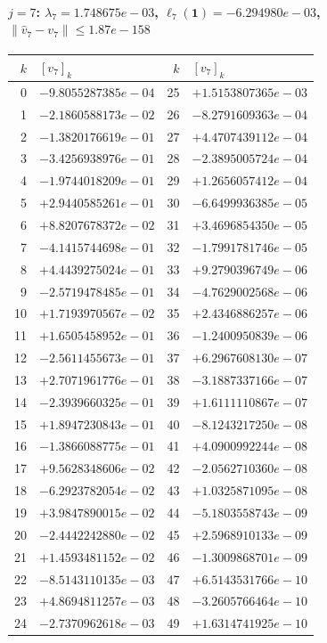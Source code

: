 \documentclass[11pt]{article}
\begin{document}
\paragraph{$j = 7$: $\lambda_{7} = 1.748675e-03$, \quad $\ell_{7}(\mathbf{1}) = -6.294980e-03$, \quad $\|\hat v_{7} - v_{7}\| \leq 1.87e-158$}
\begin{center}
{\footnotesize
\begin{tabular}{r@{\;\;}l@{\quad}r@{\;\;}l}
\toprule
$k$ & $[v_{7}]_k$ & $k$ & $[v_{7}]_k$ \\
\midrule
0 & $-9.8055287385e-04$ & 25 & $+1.5153807365e-03$ \\
1 & $-2.1860588173e-02$ & 26 & $-8.2791609363e-04$ \\
2 & $-1.3820176619e-01$ & 27 & $+4.4707439112e-04$ \\
3 & $-3.4256938976e-01$ & 28 & $-2.3895005724e-04$ \\
4 & $-1.9744018209e-01$ & 29 & $+1.2656057412e-04$ \\
5 & $+2.9440585261e-01$ & 30 & $-6.6499936385e-05$ \\
6 & $+8.8207678372e-02$ & 31 & $+3.4696854350e-05$ \\
7 & $-4.1415744698e-01$ & 32 & $-1.7991781746e-05$ \\
8 & $+4.4439275024e-01$ & 33 & $+9.2790396749e-06$ \\
9 & $-2.5719478485e-01$ & 34 & $-4.7629002568e-06$ \\
10 & $+1.7193970567e-02$ & 35 & $+2.4346886257e-06$ \\
11 & $+1.6505458952e-01$ & 36 & $-1.2400950839e-06$ \\
12 & $-2.5611455673e-01$ & 37 & $+6.2967608130e-07$ \\
13 & $+2.7071961776e-01$ & 38 & $-3.1887337166e-07$ \\
14 & $-2.3939660325e-01$ & 39 & $+1.6111110867e-07$ \\
15 & $+1.8947230843e-01$ & 40 & $-8.1243217250e-08$ \\
16 & $-1.3866088775e-01$ & 41 & $+4.0900992244e-08$ \\
17 & $+9.5628348606e-02$ & 42 & $-2.0562710360e-08$ \\
18 & $-6.2923782054e-02$ & 43 & $+1.0325871095e-08$ \\
19 & $+3.9847890015e-02$ & 44 & $-5.1803558743e-09$ \\
20 & $-2.4442242880e-02$ & 45 & $+2.5968910133e-09$ \\
21 & $+1.4593481152e-02$ & 46 & $-1.3009868701e-09$ \\
22 & $-8.5143110135e-03$ & 47 & $+6.5143531766e-10$ \\
23 & $+4.8694811257e-03$ & 48 & $-3.2605766464e-10$ \\
24 & $-2.7370962618e-03$ & 49 & $+1.6314741925e-10$ \\
\bottomrule
\end{tabular}
}
\end{center}
\end{document}
